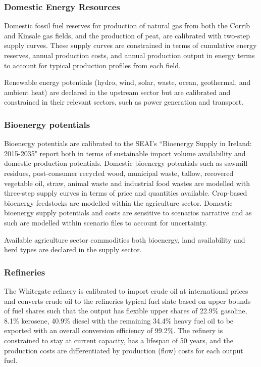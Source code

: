 \documentclass[journal abbreviation, manuscript]{copernicus}
\begin{document}
\subsubsection{Domestic Energy Resources}
Domestic fossil fuel reserves for production of natural gas from both the Corrib and Kinsale gas fields, and the production of peat, are calibrated with two-step supply curves. These supply curves are constrained in terms of cumulative energy reserves, annual production costs, and annual production output in energy terms to account for typical production profiles from each field.

Renewable energy potentials (hydro, wind, solar, waste, ocean, geothermal, and ambient heat) are declared in the upstream sector but are calibrated and constrained in their relevant sectors, such as power generation and transport.

\subsubsection{Bioenergy potentials}
Bioenergy potentials are calibrated to the SEAI's ``Bioenergy Supply in Ireland: 2015-2035" report \cite{SEAI2015} both in terms of sustainable import volume availability and domestic production potentials. Domestic bioenergy potentials such as sawmill residues, post-consumer recycled wood, municipal waste, tallow, recovered vegetable oil, straw, animal waste and industrial food wastes are modelled with three-step supply curves in terms of price and quantities available. Crop-based bioenergy feedstocks are modelled within the agriculture sector. Domestic bioenergy supply potentials and costs are sensitive to scenarios narrative and as such are modelled within scenario files to account for uncertainty.

Available agriculture sector commodities both bioenergy, land availability and herd types are declared in the supply sector.

\subsubsection{Refineries}
The Whitegate refinery is calibrated to import crude oil at international prices and converts crude oil to the refineries typical fuel slate based on upper bounds of fuel shares such that the output has flexible upper shares of 22.9\% gasoline, 8.1\% kerosene, 40.9\% diesel with the remaining 34.4\% heavy fuel oil to be exported with an overall conversion efficiency of 99.2\%. The refinery is constrained to stay at current capacity, has a lifespan of 50 years, and the production costs are differentiated by production (flow) costs for each output fuel.
\end{document}
